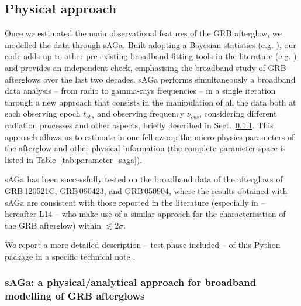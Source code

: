 \documentclass{aa}
\begin{document}
\subsection{Physical approach}
\label{par:phys_app}

Once we estimated the main observational features of the GRB afterglow, we modelled the data through {\sc sAGa}.
Built adopting a Bayesian statistics (e.g. \citealt{Sharma17,Marquette18}), our code adds up to other pre-existing broadband fitting tools in the literature (e.g. \citealt{Kobayashi99,Daigne00,Cannizzo04,Zhang09b,Vaneerten10a,Wygoda11,DeColle12,Laskar13,Leventis13,Rhodes20,Aksulu20,Ryan20,Ayache21}) and provides an independent check, emphasising the broadband study of GRB afterglows over the last two decades.
{\sc sAGa} performs simultaneously a broadband data analysis -- from radio to gamma-rays frequencies -- in a single iteration through a new approach that consists in the manipulation of all the data both at each observing epoch $t_{obs}$ and observing frequency $\nu_{obs}$, considering different radiation processes and other aspects, briefly described in Sect.~\ref{app_saga}.
This approach allows us to estimate in one fell swoop the micro-physics parameters of the afterglow and other physical information (the complete parameter space is listed in Table~\ref{tab:parameter_saga}).

{\sc sAGa} has been successfully tested on the broadband data of the afterglows of GRB\,120521C, GRB\,090423, and GRB\,050904, where the results obtained with {\sc sAGa} are consistent with those reported in the literature (especially in \citealp{Laskar14} -- hereafter L14 -- who make use of a similar approach for the characterisation of the GRB afterglow) within $\lesssim 2\sigma$.

We report a more detailed description -- test phase included -- of this Python package in a specific technical note \citep{Marongiu21a}.


\subsubsection{{\sc sAGa}: a physical/analytical approach for broadband modelling of GRB afterglows}
\label{app_saga}
\end{document}
